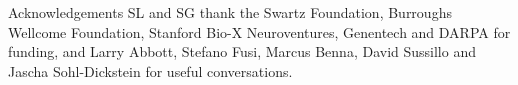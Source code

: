 \documentclass[final,hyperref={pdfpagelabels=false,bookmarks=false}]{beamer}
\begin{document}
\begin{frame}{}
\begin{columns}[t]
\begin{column}{0.3\linewidth}

\begin{block}{Acknowledgements}
%
 SL and SG thank the Swartz Foundation, Burroughs Wellcome Foundation, Stanford Bio-X Neuroventures, Genentech and DARPA for funding, and Larry Abbott, Stefano Fusi, Marcus Benna, David Sussillo and Jascha Sohl-Dickstein for useful conversations.

%
\end{block}


\end{column}





\end{columns}

\end{frame}
\end{document}
